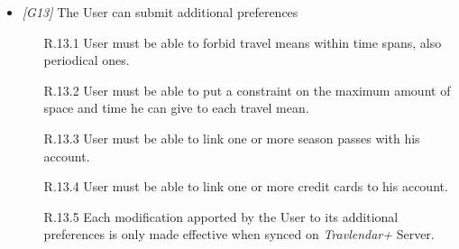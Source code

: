 \begin{itemize}
	\item \textit{[G13]} The User can submit additional preferences
		\begin{itemize}
			\item[R.13.1] User must be able to forbid travel means within time spans, also periodical ones.
			\item[R.13.2] User must be able to put a constraint on the maximum amount of space and time he can give to each travel mean.
			\item[R.13.3] User must be able to link one or more season passes with his account.
			\item[R.13.4] User must be able to link one or more credit cards to his account.
			\item[R.13.5] Each modification apported by the User to its additional preferences is only made effective when synced on \textit{Travlendar+} Server.
		\end{itemize}
		
\end{itemize}
            
\vfill
